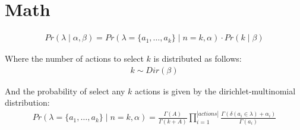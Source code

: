 \documentclass[]{article}
\begin{document}
\section*{Math}
\begin{align}
	Pr(\lambda \mid \alpha, \beta) = Pr(\lambda = \{a_1, \ldots, a_k\} \mid n = k, \alpha) \cdot Pr(k \mid \beta)
\end{align}

\noindent Where the number of actions to select $k$ is distributed as follows:
\begin{align}
	k \sim Dir(\beta)
\end{align}

\noindent And the probability of select any $k$ actions is given by the dirichlet-multinomial distribution:
\begin{align}
	Pr(\lambda = \{a_1, \ldots, a_k\} \mid n = k, \alpha) = \frac{\Gamma(A)}{\Gamma(k + A)} \prod_{i = 1}^{|actions|} \frac{\Gamma(\delta(a_i \in \lambda) + \alpha_i)}{\Gamma(a_i)} 
\end{align}
\end{document}
